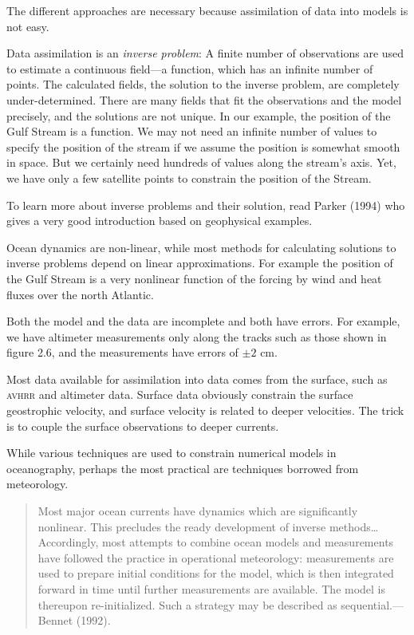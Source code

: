 The different approaches are necessary because assimilation of data into models is not easy.
\begin{enumerate}
\vitem Data assimilation is an
\textit{inverse problem}: A finite
number of observations are used to estimate a continuous field---a
function, which has an infinite number of points. The calculated
fields, the solution to the inverse problem, are completely
under-determined. There are many fields that fit the observations and
the model precisely, and the solutions are not unique. In our example,
the position of the Gulf Stream is a
function. We may not need an infinite number of values to specify the
position of the stream if we assume the position is somewhat smooth in
space. But we certainly need hundreds of values along the stream's
axis. Yet, we have only a few satellite points to constrain the
position of the Stream.

To learn more about inverse problems and their solution, read Parker
(1994) who gives a very good introduction based on geophysical
examples.

\vitem Ocean dynamics are non-linear, while most methods for
calculating solutions to inverse problems depend on linear
approximations. For example the position of the Gulf Stream is a very nonlinear function of the forcing by
wind and heat fluxes over the north Atlantic.

\vitem Both the model and the data are incomplete and both have
errors. For example, we have altimeter measurements only along the
tracks such as those shown in figure 2.6, and the measurements have
errors of $\pm 2$ cm.

\vitem Most data available for assimilation
into data comes from the surface, such as \textsc{avhrr}
and altimeter
data. Surface data obviously constrain the surface geostrophic
velocity, and surface velocity is related to deeper velocities. The
trick is to couple the surface observations to deeper currents.
\end{enumerate}

While various techniques are used to constrain numerical models in
oceanography, perhaps the most practical are techniques borrowed from
meteorology.
\begin{quote} \small
Most major ocean currents have dynamics which are significantly
nonlinear. This precludes the ready development of inverse
methods\dots Accord\-ing\-ly, most attempts to combine ocean models
and measurements have followed the practice in operational
meteorology: measurements are used to prepare initial conditions for
the model, which is then integrated forward in time until further
measurements are available. The model is thereupon
re-initialized. Such a strategy may be described as
sequential.---Bennet (1992).
\end{quote}

